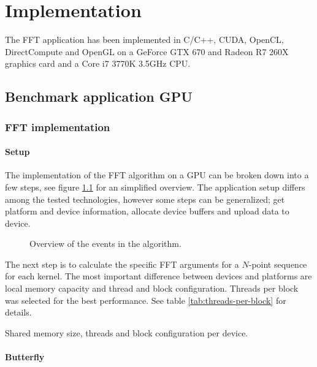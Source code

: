 \chapter{Implementation}

The FFT application has been implemented in C/C++, CUDA, OpenCL, DirectCompute and OpenGL on a GeForce GTX 670 and Radeon R7 260X graphics card and a Core i7 3770K 3.5GHz CPU.

\section{Benchmark application GPU}

\subsection{FFT implementation}

\subsubsection{Setup}

The implementation of the FFT algorithm on a GPU can be broken down into a few steps, see figure \ref{fig:algorithm-overview} for an simplified overview. The application setup differs among the tested technologies, however some steps can be generalized; get platform and device information, allocate device buffers and upload data to device.
\begin{figure}
	\centering
	
	\caption{Overview of the events in the algorithm.}
	\label{fig:algorithm-overview}
\end{figure}

The next step is to calculate the specific FFT arguments for a $N$-point sequence for each kernel. The most important difference between devices and platforms are local memory capacity and thread and block configuration. Threads per block was selected for the best performance. See table \ref{tab:threads-per-block} for details.
\begin{table}
	\centering
	
	\caption{Shared memory size, threads and block configuration per device.}
	\label{tab:threads-per-block}
\end{table}

\subsubsection{Butterfly}

